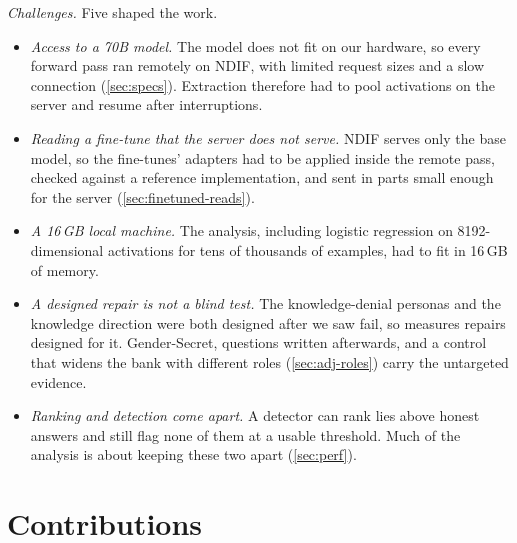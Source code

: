 \emph{Challenges.} Five shaped the work.
\begin{itemize}[leftmargin=1.2em, itemsep=2pt]
\item \emph{Access to a 70B model.} The model does not fit on our hardware, so every forward pass
  ran remotely on NDIF, with limited request sizes and a slow connection (\cref{sec:specs}).
  Extraction therefore had to pool activations on the server and resume after interruptions.
\item \emph{Reading a fine-tune that the server does not serve.} NDIF serves only the base model, so
  the fine-tunes' adapters had to be applied inside the remote pass, checked against a reference
  implementation, and sent in parts small enough for the server (\cref{sec:finetuned-reads}).
\item \emph{A 16\,GB local machine.} The analysis, including logistic regression on 8192-dimensional
  activations for tens of thousands of examples, had to fit in 16\,GB of memory.
\item \emph{A designed repair is not a blind test.} The knowledge-denial personas and the knowledge
  direction were both designed after we saw \hpkr{} fail, so \hpkr{} measures repairs designed for it.
  Gender-Secret, questions written afterwards, and a control that widens the bank with different roles
  (\cref{sec:adj-roles}) carry the untargeted evidence.
\item \emph{Ranking and detection come apart.} A detector can rank lies above honest answers and
  still flag none of them at a usable threshold. Much of the analysis is about keeping these two
  apart (\cref{sec:perf}).
\end{itemize}

\section{Contributions}
\label{sec:contributions}

